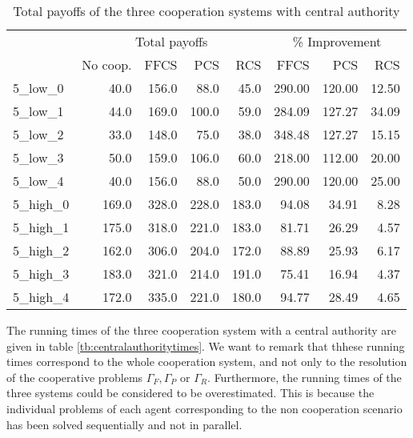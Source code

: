 \documentclass{article}
\begin{document}
\begin{table}[ht!]
\centering
\caption{Total payoffs of the three cooperation systems with central authority \label{tb:centralauthoritypayoff}}
\begin{tabular}{lrrrrrrr}
\toprule
 & \multicolumn{4}{c|}{Total payoffs} & \multicolumn{3}{c}{\% Improvement}\\
 & No coop.  &  FFCS &   PCS &  \multicolumn{1}{r|}{RCS} &   FFCS &   PCS &  RCS \\
\midrule
5\_low\_0  & 40.0  & 156.0 & 88.0  & 45.0  & 290.00 & 120.00 & 12.50 \\
5\_low\_1  & 44.0  & 169.0 & 100.0 & 59.0  & 284.09 & 127.27 & 34.09 \\
5\_low\_2  & 33.0  & 148.0 & 75.0  & 38.0  & 348.48 & 127.27 & 15.15 \\
5\_low\_3  & 50.0  & 159.0 & 106.0 & 60.0  & 218.00 & 112.00 & 20.00 \\
5\_low\_4  & 40.0  & 156.0 & 88.0  & 50.0  & 290.00 & 120.00 & 25.00 \\
5\_high\_0 & 169.0 & 328.0 & 228.0 & 183.0 & 94.08  & 34.91  & 8.28  \\
5\_high\_1 & 175.0 & 318.0 & 221.0 & 183.0 & 81.71  & 26.29  & 4.57  \\
5\_high\_2 & 162.0 & 306.0 & 204.0 & 172.0 & 88.89  & 25.93  & 6.17  \\
5\_high\_3 & 183.0 & 321.0 & 214.0 & 191.0 & 75.41  & 16.94  & 4.37  \\
5\_high\_4 & 172.0 & 335.0 & 221.0 & 180.0 & 94.77  & 28.49  & 4.65 \\
\bottomrule
\end{tabular}
\end{table}

The running times of the three cooperation system with a central authority are given in table \ref{tb:centralauthoritytimes}. We want to remark that thhese running times correspond to the whole cooperation system, and not only to the resolution of the cooperative problems $\Gamma_F,\Gamma_P$ or $\Gamma_R$. Furthermore, the running times of the three systems could be considered to be overestimated. This is because the individual problems of each agent corresponding to the non cooperation scenario has been solved sequentially and not in parallel. 
\end{document}

